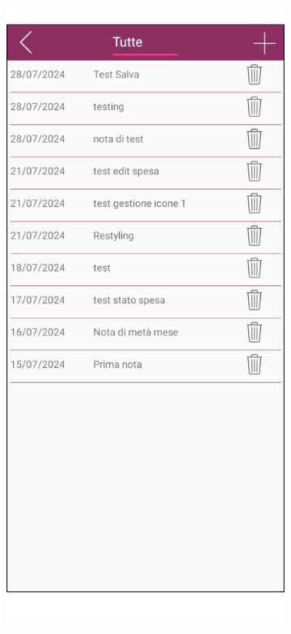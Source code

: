\begin{figure}[H]
    \begin{subfigure}{.5\textwidth}
        \centering
        \includegraphics[width=.7\columnwidth]{images/screenshot/old/allNote.png}\vspace{2mm}
    \end{subfigure}
    \begin{subfigure}{.5\textwidth}
        \centering

\end{subfigure}
\end{figure}
